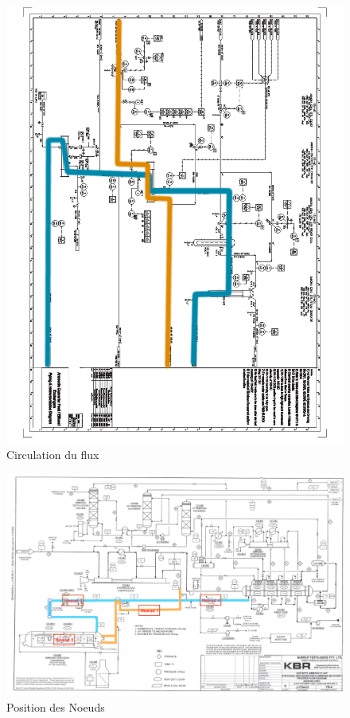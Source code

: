 \documentclass[a4paper,12pt, oneside]{article}
\begin{document}
\begin{figure}[h]
	\includegraphics[scale=0.5]{Plan2-2.png}
	\caption{Circulation du flux}
	\label{cir3}
	\end{figure}
\begin{figure}[h]
\includegraphics[scale=0.4]{Position_des_differents_noeuds.png} 
	\caption{Position des  Noeuds}
	\label{cir4}
\end{figure}
\end{document}
